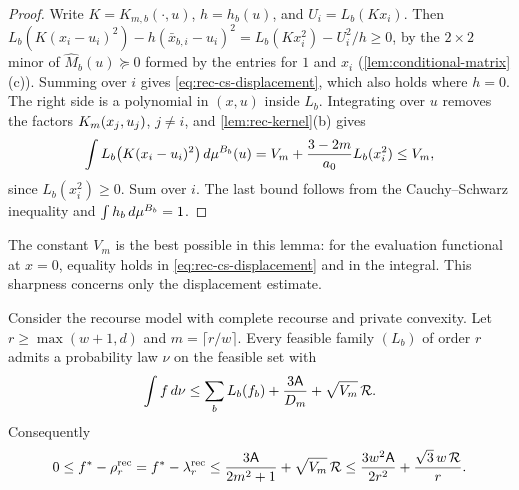 \begin{proof}
Write $K=K_{m,b}(\cdot,u)$, $h=h_b(u)$, and $U_i=L_b(Kx_i)$. Then
$L_b(K(x_i-u_i)^2)-h(\bar x_{b,i}-u_i)^2=L_b(Kx_i^2)-U_i^2/h\ge0$, by the
$2\times2$ minor of $\widehat M_b(u)\succeq0$ formed by the entries for $1$ and
$x_i$ (\cref{lem:conditional-matrix}(c)). Summing over $i$ gives
\eqref{eq:rec-cs-displacement}, which also holds where $h=0$. The
right side is a polynomial in $(x,u)$ inside $L_b$. Integrating over $u$
removes the factors $K_m(x_j,u_j)$, $j\ne i$, and \cref{lem:rec-kernel}(b)
gives
\[
  \int L_b\bigl(K(x_i-u_i)^2\bigr)\,d\mu^{B_b}(u)
  =V_m+\frac{3-2m}{a_0}L_b(x_i^2)\le V_m,
\]
since $L_b(x_i^2)\ge0$. Sum over $i$. The last bound follows from the
Cauchy--Schwarz inequality and $\int h_b\,d\mu^{B_b}=1$.
\end{proof}

The constant $V_m$ is the best possible in this lemma: for the evaluation
functional at $x=0$, equality holds in \eqref{eq:rec-cs-displacement} and
in the integral. This sharpness concerns only the displacement estimate.

\begin{theorem}\label{thm:affine-recourse}
Consider the recourse model with complete recourse and private convexity.
Let $r\ge\max(w+1,d)$ and $m=\lceil r/w\rceil$. Every feasible family
$(L_b)$ of order $r$ admits a probability law $\nu$ on the feasible set with
\begin{equation}\label{eq:rec-affine-rounding}
  \int f\,d\nu\le\sum_bL_b(f_b)+\frac{3\mathsf{A}}{D_m}+\sqrt{V_m}\,\mathcal R .
\end{equation}
Consequently
\[
  0\le f^{*}-\rho^{\mathrm{rec}}_r=f^{*}-\lambda^{\mathrm{rec}}_r
  \le\frac{3\mathsf{A}}{2m^2+1}+\sqrt{V_m}\,\mathcal R
  \le\frac{3w^2\mathsf{A}}{2r^2}+\frac{\sqrt3\,w\,\mathcal R}{r}.
\]
\end{theorem}

